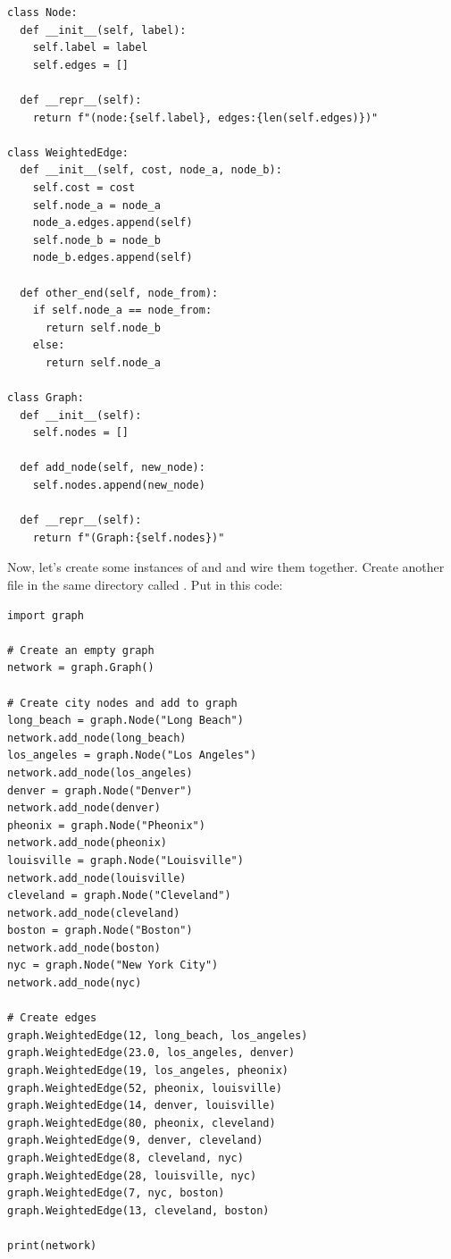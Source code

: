 \begin{verbatim}
class Node:
  def __init__(self, label):
    self.label = label
    self.edges = []

  def __repr__(self):
    return f"(node:{self.label}, edges:{len(self.edges)})"

class WeightedEdge:
  def __init__(self, cost, node_a, node_b):
    self.cost = cost
    self.node_a = node_a
    node_a.edges.append(self)
    self.node_b = node_b
    node_b.edges.append(self)

  def other_end(self, node_from):
    if self.node_a == node_from:
      return self.node_b
    else:
      return self.node_a

class Graph:
  def __init__(self):
    self.nodes = []

  def add_node(self, new_node):
    self.nodes.append(new_node)

  def __repr__(self):
    return f"(Graph:{self.nodes})"
\end{verbatim}

Now, let's create some instances of  and
 and wire them together. Create another file in
the same directory called . Put in this code:

\begin{verbatim}
import graph

# Create an empty graph
network = graph.Graph()

# Create city nodes and add to graph
long_beach = graph.Node("Long Beach")
network.add_node(long_beach)
los_angeles = graph.Node("Los Angeles")
network.add_node(los_angeles)
denver = graph.Node("Denver")
network.add_node(denver)
pheonix = graph.Node("Pheonix")
network.add_node(pheonix)
louisville = graph.Node("Louisville")
network.add_node(louisville)
cleveland = graph.Node("Cleveland")
network.add_node(cleveland)
boston = graph.Node("Boston")
network.add_node(boston)
nyc = graph.Node("New York City")
network.add_node(nyc)

# Create edges
graph.WeightedEdge(12, long_beach, los_angeles)
graph.WeightedEdge(23.0, los_angeles, denver)
graph.WeightedEdge(19, los_angeles, pheonix)
graph.WeightedEdge(52, pheonix, louisville)
graph.WeightedEdge(14, denver, louisville)
graph.WeightedEdge(80, pheonix, cleveland)
graph.WeightedEdge(9, denver, cleveland)
graph.WeightedEdge(8, cleveland, nyc)
graph.WeightedEdge(28, louisville, nyc)
graph.WeightedEdge(7, nyc, boston)
graph.WeightedEdge(13, cleveland, boston)

print(network)
\end{verbatim}

